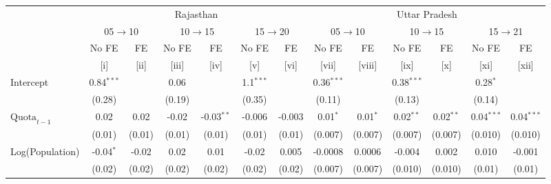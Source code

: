 
\begingroup
\centering
\scriptsize
\begin{adjustbox}{max width=\linewidth}
   \begin{threeparttable}[b]
      \begin{tabular}{lcccccccccccc}
         \toprule
          & \multicolumn{6}{c}{Rajasthan} & \multicolumn{6}{c}{Uttar Pradesh} \\ 
          & \multicolumn{2}{c}{05$\rightarrow$10} & \multicolumn{2}{c}{10$\rightarrow$15} & \multicolumn{2}{c}{15$\rightarrow$20} & \multicolumn{2}{c}{05$\rightarrow$10} & \multicolumn{2}{c}{10$\rightarrow$15} & \multicolumn{2}{c}{15$\rightarrow$21} \\ 
                               & No FE        & FE            & No FE        & FE            & No FE        & FE            & No FE         & FE            & No FE         & FE            & No FE         & FE \\   
                               & [i]          & [ii]          & [iii]        & [iv]          & [v]          & [vi]          & [vii]         & [viii]        & [ix]          & [x]           & [xi]          & [xii]\\  
         \midrule 
         Intercept             & 0.84$^{***}$ &               & 0.06         &               & 1.1$^{***}$  &               & 0.36$^{***}$  &               & 0.38$^{***}$  &               & 0.28$^{*}$    &   \\   
                               & (0.28)       &               & (0.19)       &               & (0.35)       &               & (0.11)        &               & (0.13)        &               & (0.14)        &   \\   
         $\text{Quota}_{t-1}$  & 0.02         & 0.02          & -0.02        & -0.03$^{**}$  & -0.006       & -0.003        & 0.01$^{*}$    & 0.01$^{*}$    & 0.02$^{**}$   & 0.02$^{**}$   & 0.04$^{***}$  & 0.04$^{***}$\\   
                               & (0.01)       & (0.01)        & (0.01)       & (0.01)        & (0.01)       & (0.01)        & (0.007)       & (0.007)       & (0.007)       & (0.007)       & (0.010)       & (0.010)\\   
         Log(Population)       & -0.04$^{*}$  & -0.02         & 0.02         & 0.01          & -0.02        & 0.005         & -0.0008       & 0.0006        & -0.004        & 0.002         & 0.010         & -0.001\\   
                               & (0.02)       & (0.02)        & (0.02)       & (0.02)        & (0.02)       & (0.02)        & (0.007)       & (0.007)       & (0.010)       & (0.010)       & (0.01)        & (0.01)\\   

\end{tabular}
\end{threeparttable}
\end{adjustbox}
